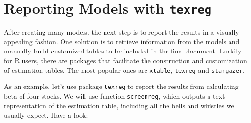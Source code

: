 \documentclass[11pt,]{book}
\newenvironment{Shaded}{\begin{snugshade}}{\end{snugshade}}
\newcommand{\KeywordTok}[1]{\textcolor[rgb]{0.27,0.27,0.27}{\textbf{#1}}}
\newcommand{\DataTypeTok}[1]{\textcolor[rgb]{0.27,0.27,0.27}{#1}}
\newcommand{\DecValTok}[1]{\textcolor[rgb]{0.06,0.06,0.06}{#1}}
\newcommand{\StringTok}[1]{\textcolor[rgb]{0.5,0.5,0.5}{#1}}
\newcommand{\CommentTok}[1]{\textcolor[rgb]{0.56,0.35,0.01}{\textit{#1}}}
\newcommand{\OperatorTok}[1]{\textcolor[rgb]{0.81,0.36,0.00}{\textbf{#1}}}
\newcommand{\NormalTok}[1]{#1}
\begin{document}
\section{\texorpdfstring{Reporting Models with
\texttt{texreg}}{Reporting Models with texreg}}\label{reporting-models}

After creating many models, the next step is to report the results in a
visually appealing fashion. One solution is to retrieve information from
the models and manually build customized tables to be included in the
final document. Luckily for R users, there are packages that facilitate
the construction and customization of estimation tables. The most
popular ones are \texttt{xtable}, \texttt{texreg} and
\texttt{stargazer}.   

As an example, let's use package \texttt{texreg} to report the results
from calculating beta of four stocks. We will use function
\texttt{screenreg}, which outputs a text representation of the
estimation table, including all the bells and whistles we usually
expect. Have a look:

\begin{Shaded}
\end{Shaded}
\end{document}

